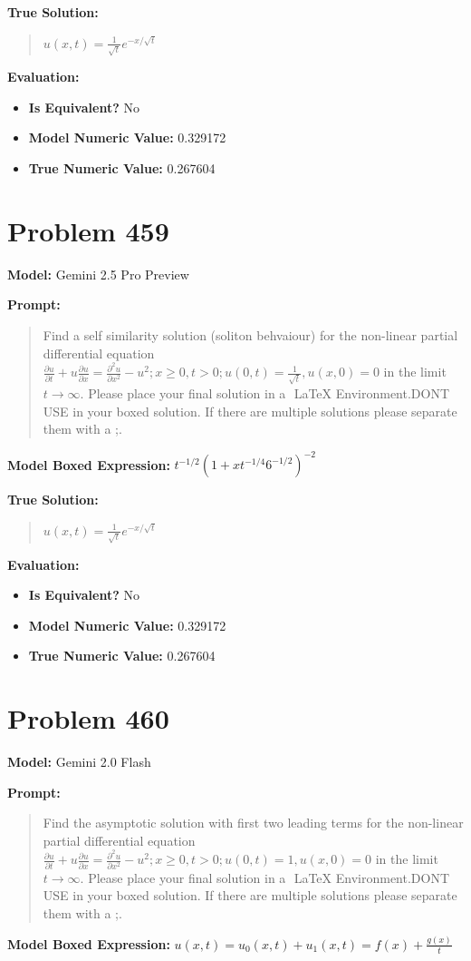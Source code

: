 \documentclass{article}
\begin{document}
\textbf{True Solution:}
\begin{quote}
$u(x,t) = \frac{1}{\sqrt{t}} e^{-x/\sqrt{t}}$
\end{quote}

\textbf{Evaluation:}
\begin{itemize}
\item \textbf{Is Equivalent?} No
\item \textbf{Model Numeric Value:} 0.329172
\item \textbf{True Numeric Value:} 0.267604
\end{itemize}
\vspace{1cm}
\section*{Problem 459}
\textbf{Model:} Gemini 2.5 Pro Preview

\textbf{Prompt:}
\begin{quote}
Find a self similarity solution (soliton behvaiour) for the non-linear partial differential equation $\frac{\partial u}{\partial t} + u \frac{\partial u}{\partial x} = \frac{\partial^2 u}{\partial x^2} - u^2; x \geq 0, t > 0; u(0, t) = \frac{1}{\sqrt{t}}, u(x,0) = 0$ in the limit $t \rightarrow \infty$. Please place your final solution in a $\boxed{}$ LaTeX Environment.DONT USE \operatorname in your boxed solution. If there are multiple solutions please separate them with a ;.
\end{quote}
\textbf{Model Boxed Expression:} $t^{-1/2} \left(1 + x t^{-1/4} 6^{-1/2}\right)^{-2}$

\textbf{True Solution:}
\begin{quote}
$u(x,t) = \frac{1}{\sqrt{t}} e^{-x/\sqrt{t}}$
\end{quote}

\textbf{Evaluation:}
\begin{itemize}
\item \textbf{Is Equivalent?} No
\item \textbf{Model Numeric Value:} 0.329172
\item \textbf{True Numeric Value:} 0.267604
\end{itemize}
\vspace{1cm}
\section*{Problem 460}
\textbf{Model:} Gemini 2.0 Flash

\textbf{Prompt:}
\begin{quote}
Find the asymptotic solution with first two leading terms for the non-linear partial differential equation $\frac{\partial u}{\partial t} + u \frac{\partial u}{\partial x} = \frac{\partial^2 u}{\partial x^2} - u^2; x \geq 0, t > 0; u(0, t) = 1, u(x,0) = 0$ in the limit $t \rightarrow \infty$. Please place your final solution in a $\boxed{}$ LaTeX Environment.DONT USE \operatorname in your boxed solution. If there are multiple solutions please separate them with a ;.
\end{quote}
\textbf{Model Boxed Expression:} $u(x,t) = u_0(x,t) + u_1(x,t) = f(x) + \frac{g(x)}{t}$
\end{document}

